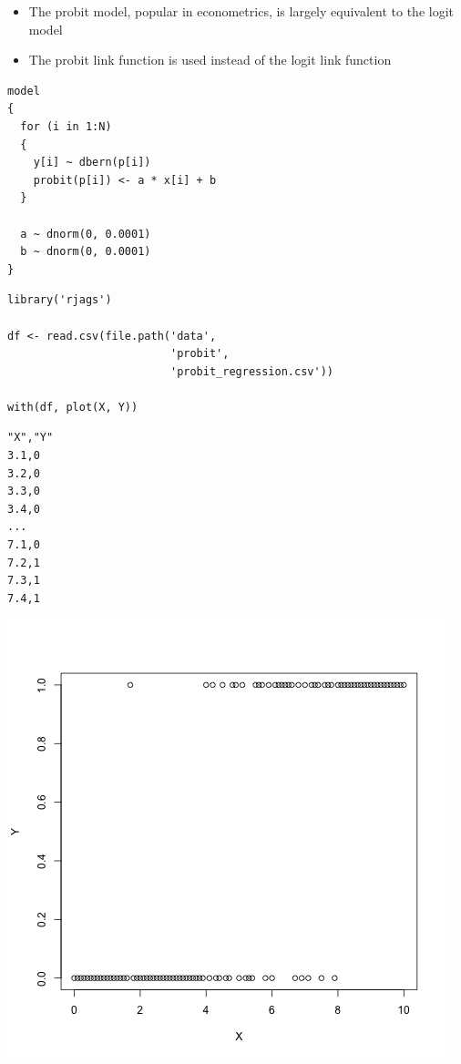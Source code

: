 \documentclass{beamer}
\begin{document}
\begin{frame}
  \begin{itemize}
    \item{The probit model, popular in econometrics, is largely equivalent to the logit model}
    \item{The probit link function is used instead of the logit link function}
  \end{itemize}
\end{frame}

\begin{frame}[fragile]
  \begin{verbatim}
model
{
  for (i in 1:N)
  {
    y[i] ~ dbern(p[i])
    probit(p[i]) <- a * x[i] + b
  }
  
  a ~ dnorm(0, 0.0001)
  b ~ dnorm(0, 0.0001)
}
  \end{verbatim}
\end{frame}

\begin{frame}[fragile]
  \begin{verbatim}
library('rjags')

df <- read.csv(file.path('data',
                         'probit',
                         'probit_regression.csv'))

with(df, plot(X, Y))
  \end{verbatim}
\end{frame}

\begin{frame}[fragile]
  \begin{verbatim}
"X","Y"
3.1,0
3.2,0
3.3,0
3.4,0
...
7.1,0
7.2,1
7.3,1
7.4,1
  \end{verbatim}
\end{frame}

\begin{frame}[fragile]
  \begin{center}
    \includegraphics[scale = 0.4]{../graphs/probit/data_plot.png}
  \end{center}
\end{frame}
\end{document}
